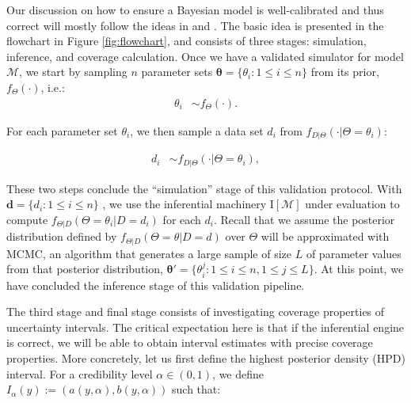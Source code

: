 \documentclass[oneside]{article}
\begin{document}
\vspace{-1cm}


Our discussion on how to ensure a Bayesian model is well-calibrated and thus correct will mostly follow the ideas in \citet{Cook2006} and \citet{Talts2018}.
The basic idea is presented in the flowchart in Figure \ref{fig:flowchart}, and consists of three stages: simulation, inference, and coverage calculation.
Once we have a validated simulator for model $\mathcal{M}$, we start by sampling $n$ parameter sets $\boldsymbol{\theta} = \{\theta_i : 1 \leq i \leq n\}$ from its prior,
$f_\Theta(\cdot)$, i.e.:
\begin{align*}
 \theta_i & \sim f_\Theta(\cdot).
\end{align*}

For each parameter set $\theta_i$, we then sample a data set
$d_i$ from
$f_{D|\Theta}(\cdot|\Theta=\theta_i)$:

\vspace{-1cm}
\begin{align*}
   d_i & \sim  f_{D|\Theta}(\cdot | \Theta=\theta_i),
\end{align*}

These two steps conclude the ``simulation'' stage of this validation protocol.
With
$\boldsymbol{d} = \{d_i: 1 \leq i \leq n\}$
, we use the inferential machinery $\text{I}[\mathcal{M}]$ under
evaluation to compute
$f_{\Theta|D}(\Theta=\theta_i|D=d_i)$ for each $d_i$.
Recall that we assume the posterior distribution defined by $f_{\Theta|D}(\Theta=\theta|D=d)$ over $\Theta$ will be approximated with MCMC, an algorithm that generates a large sample of size $L$ of parameter values from that posterior distribution, $\boldsymbol{\theta}' = \{ \theta_i^j: 1 \leq i \leq n, 1 \leq j \leq L\}$.
At this point, we have concluded the inference stage of this validation pipeline.

The third stage and final stage consists of investigating coverage properties of uncertainty intervals.
The critical expectation here is that if the inferential engine is correct, we will be able to obtain interval estimates with precise coverage properties.
More concretely, let us first define the highest posterior density (HPD) interval.
For a credibility level $\alpha \in (0, 1)$, we define $I_\alpha(y) := (a(y, \alpha), b(y, \alpha))$
such that:
\end{document}
